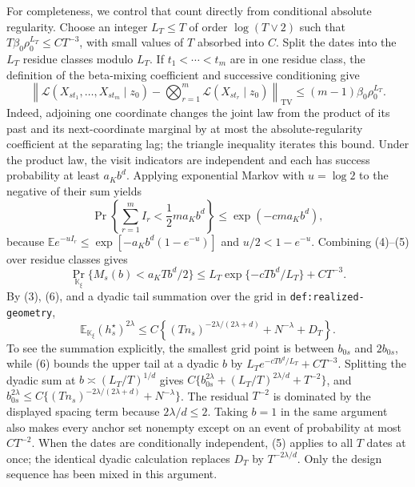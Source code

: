 For completeness, we control that count directly from conditional absolute
regularity.  Choose an integer
\(L_T\le T\) of order \(\log(T\vee2)\) such that
\(T\beta_0\rho_0^{L_T}\le CT^{-3}\), with small values of \(T\) absorbed
into \(C\).  Split the dates into the \(L_T\) residue classes modulo
\(L_T\).  If \(t_1<\cdots<t_m\) are in one residue class, the definition of
the beta-mixing coefficient and successive conditioning give
\[
 \left\|\mathcal L(X_{st_1},\ldots,X_{st_m}\mid z_0)
 -\bigotimes_{r=1}^{m}\mathcal L(X_{st_r}\mid z_0)
 \right\|_{\mathrm{TV}}
 \le(m-1)\beta_0\rho_0^{L_T}.                                \tag{4}
\]
Indeed, adjoining one coordinate changes the joint law from the product of
its past and its next-coordinate marginal by at most the absolute-regularity
coefficient at the separating lag; the triangle inequality iterates this
bound.  Under the product law, the visit indicators are independent and
each has success probability at least \(a_Kb^d\).  Applying exponential
Markov with \(u=\log2\) to the negative of their sum yields
\[
 \Pr\left\{\sum_{r=1}^{m}I_r<\frac12ma_Kb^d\right\}
 \le \exp(-cma_Kb^d),                                        \tag{5}
\]
because
\(\mathbb E e^{-uI_r}\le
 \exp[-a_Kb^d(1-e^{-u})]\) and
\(u/2<1-e^{-u}\).  Combining (4)--(5) over residue classes gives
\[
 \Pr_{\mathbb K_\xi}
 \{M_s(b)<a_KTb^d/2\}
 \le L_T\exp\{-cTb^d/L_T\}+CT^{-3}.                         \tag{6}
\]
By (3), (6), and a dyadic tail summation over the grid in
\texttt{def:realized-geometry},
\[
 \mathbb E_{\mathbb K_\xi}(h_s^\star)^{2\lambda}
 \le C\left\{
 (Tn_s)^{-2\lambda/(2\lambda+d)}+N^{-\lambda}+D_T
 \right\}.                                                    \tag{7}
\]
To see the summation explicitly, the smallest grid point is between
\(b_{0s}\) and \(2b_{0s}\), while (6) bounds the upper tail at a dyadic
\(b\) by \(L_Te^{-cTb^d/L_T}+CT^{-3}\).  Splitting the dyadic sum at
\(b\asymp(L_T/T)^{1/d}\) gives
\(C\{b_{0s}^{2\lambda}+(L_T/T)^{2\lambda/d}+T^{-2}\}\), and
\(b_{0s}^{2\lambda}\le
C\{(Tn_s)^{-2\lambda/(2\lambda+d)}+N^{-\lambda}\}\).
The residual \(T^{-2}\) is dominated by the displayed spacing term because
\(2\lambda/d\le2\).  Taking \(b=1\) in the same argument also makes every
anchor set nonempty except on an event of probability at most \(CT^{-2}\).
When the dates are conditionally independent, (5) applies to all \(T\)
dates at once; the identical dyadic calculation replaces \(D_T\) by
\(T^{-2\lambda/d}\).  Only the design sequence has been mixed in this
argument.

